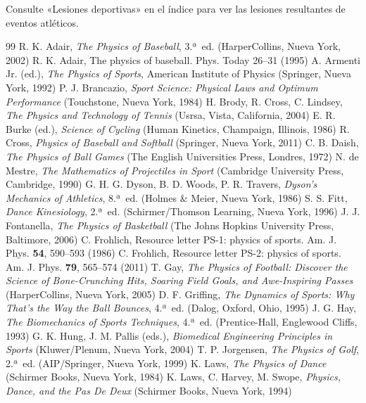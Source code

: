 \documentclass[12pt,a4paper]{book}
\begin{document}
Consulte «Lesiones deportivas» en el índice para ver las lesiones resultantes de eventos atléticos.

\begin{thebibliography}{99}
 R. K. Adair, \emph{The Physics of Baseball}, 3.ª~ed. (HarperCollins, Nueva York, 2002)
 R. K. Adair, The physics of baseball. Phys. Today 26--31 (1995)
 A. Armenti Jr. (ed.), \emph{The Physics of Sports}, American Institute of Physics (Springer, Nueva York, 1992)
 P. J. Brancazio, \emph{Sport Science: Physical Laws and Optimum Performance} (Touchstone, Nueva York, 1984)
 H. Brody, R. Cross, C. Lindsey, \emph{The Physics and Technology of Tennis} (Usrsa, Vista, California, 2004)
 E. R. Burke (ed.), \emph{Science of Cycling} (Human Kinetics, Champaign, Illinois, 1986)
 R. Cross, \emph{Physics of Baseball and Softball} (Springer, Nueva York, 2011)
 C. B. Daish, \emph{The Physics of Ball Games} (The English Universities Press, Londres, 1972)
 N. de Mestre, \emph{The Mathematics of Projectiles in Sport} (Cambridge University Press, Cambridge, 1990)
 G. H. G. Dyson, B. D. Woods, P. R. Travers, \emph{Dyson's Mechanics of Athletics}, 8.ª~ed. (Holmes \& Meier, Nueva York, 1986)
 S. S. Fitt, \emph{Dance Kinesiology}, 2.ª~ed. (Schirmer/Thomson Learning, Nueva York, 1996)
 J. J. Fontanella, \emph{The Physics of Basketball} (The Johns Hopkins University Press, Baltimore, 2006)
 C. Frohlich, Resource letter PS-1: physics of sports. Am. J. Phys. \textbf{54}, 590--593 (1986)
 C. Frohlich, Resource letter PS-2: physics of sports. Am. J. Phys. \textbf{79}, 565--574 (2011)
 T. Gay, \emph{The Physics of Football: Discover the Science of Bone-Crunching Hits, Soaring Field Goals, and Awe-Inspiring Passes} (HarperCollins, Nueva York, 2005)
 D. F. Griffing, \emph{The Dynamics of Sports: Why That's the Way the Ball Bounces}, 4.ª~ed. (Dalog, Oxford, Ohio, 1995)
 J. G. Hay, \emph{The Biomechanics of Sports Techniques}, 4.ª~ed. (Prentice-Hall, Englewood Cliffs, 1993)
 G. K. Hung, J. M. Pallis (eds.), \emph{Biomedical Engineering Principles in Sports} (Kluwer/Plenum, Nueva York, 2004)
 T. P. Jorgensen, \emph{The Physics of Golf}, 2.ª~ed. (AIP/Springer, Nueva York, 1999)
 K. Laws, \emph{The Physics of Dance} (Schirmer Books, Nueva York, 1984)
 K. Laws, C. Harvey, M. Swope, \emph{Physics, Dance, and the Pas De Deux} (Schirmer Books, Nueva York, 1994)

\end{thebibliography}
\end{document}
